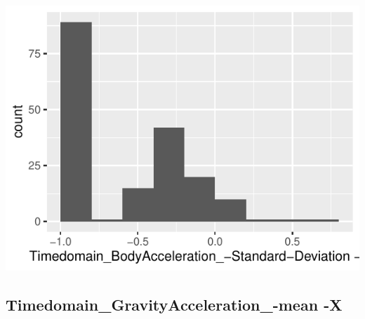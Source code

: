 \documentclass[
]{article}
\begin{document}
\begin{minipage}{0.25 \textwidth}

\includegraphics{codebook_tidydatasub_files/figure-latex/Var-8-Timedomain-BodyAcceleration--Standard-Deviation--Z-1.pdf}

\end{minipage}

\noindent\makebox[\linewidth]{\rule{\textwidth}{0.4pt}}

\hypertarget{timedomain_gravityacceleration_-mean--x}{%
\subsection{Timedomain\_GravityAcceleration\_-mean
-X}\label{timedomain_gravityacceleration_-mean--x}}
\end{document}
